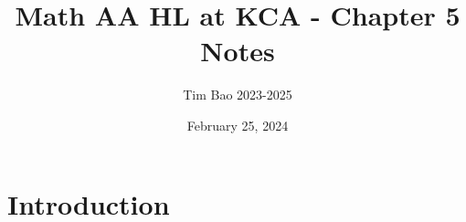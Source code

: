 \documentclass[11pt]{article}
\title{Math AA HL at KCA - Chapter 5 Notes}
\author{Tim Bao 2023-2025}
\date{February 25, 2024}
\begin{document}
\maketitle
\pagebreak

\section{Introduction}
\end{document}
